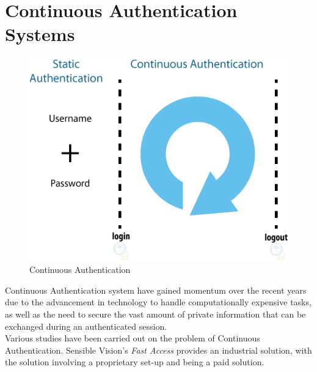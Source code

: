 \documentclass[12pt]{report}			%
\begin{document}
\section{ Continuous Authentication Systems }
\begin{figure}
	\centering
		\includegraphics[scale=0.6]{img/ca1.png}
	\caption{Continuous Authentication}
\end{figure}
Continuous Authentication system have gained momentum over the recent years due to the advancement in technology to handle computationally expensive tasks, as well as the need to secure the vast amount of private information that can be exchanged during an authenticated session.\\
Various studies\cite{mon00,turk03,sim07,azz08,azz082,kang06,car03} have been carried out on the problem of Continuous Authentication.
Sensible Vision's \emph{Fast Access} provides an industrial solution, with the solution involving a proprietary set-up and being a paid solution.
\end{document}
